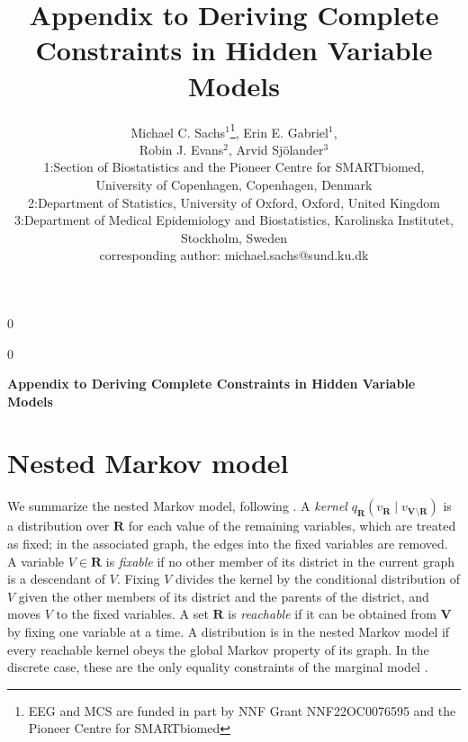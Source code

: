 \documentclass[12pt]{article}
\newcommand{\bV}{\boldsymbol{V}}
\newcommand{\bR}{\boldsymbol{R}}
\def\spacingset#1{\renewcommand{\baselinestretch}%
{#1}\small\normalsize} \spacingset{1}
\newcommand{\blind}{0}
\begin{document}
\blind
{
  \title{\bf Appendix to Deriving Complete Constraints in Hidden Variable Models}
  \author{Michael C. Sachs$^1$\thanks{EEG and MCS are funded in part by NNF Grant NNF22OC0076595 and the Pioneer Centre for SMARTbiomed}, Erin E. Gabriel$^1$, \\
  Robin J. Evans$^2$,
  Arvid Sj\"olander$^3$\\  
\footnotesize 1:Section of Biostatistics and the Pioneer Centre for SMARTbiomed, \\ \footnotesize University of Copenhagen, Copenhagen, Denmark \\
\footnotesize 2:Department of Statistics, University of Oxford, Oxford, United Kingdom \\
\footnotesize 3:Department of Medical Epidemiology and Biostatistics, Karolinska Institutet, Stockholm, Sweden \\
\footnotesize corresponding author: michael.sachs@sund.ku.dk}
  \maketitle
} \fi 

\blind
{
  \bigskip
  \bigskip
  \bigskip
  \begin{center}
    {\LARGE\bf Appendix to Deriving Complete Constraints in Hidden Variable Models}
\end{center}
  \medskip
} \fi

\bigskip


\newpage
\spacingset{2}
\vspace{-1cm}


\clearpage

\appendix

\section{Nested Markov model} \label{sec:nmm}

We summarize the nested Markov model, following \citet{richardson2023nested}. A \emph{kernel} $q_{\bR}(v_{\bR} \mid v_{\bV \setminus \bR})$ is a distribution over $\bR$ for each value of the remaining variables, which are treated as fixed; in the associated graph, the edges into the fixed variables are removed. A variable $V \in \bR$ is \emph{fixable} if no other member of its district in the current graph is a descendant of $V$. Fixing $V$ divides the kernel by the conditional distribution of $V$ given the other members of its district and the parents of the district, and moves $V$ to the fixed variables. A set $\bR$ is \emph{reachable} if it can be obtained from $\bV$ by fixing one variable at a time. A distribution is in the nested Markov model if every reachable kernel obeys the global Markov property of its graph. In the discrete case, these are the only equality constraints of the marginal model \citep{evans2018margins}.
\end{document}
